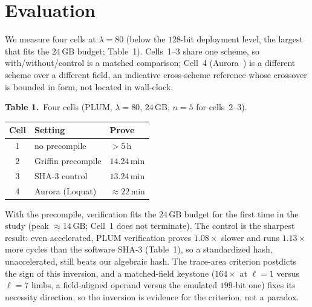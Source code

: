 \section{Evaluation}
We measure four cells at $\lambda=80$ (below the $128$-bit deployment level, the largest that fits the $24\,\mathrm{GB}$ budget; Table~1). Cells~1--3 share one scheme, so with/without/control is a matched comparison; Cell~4 (Aurora~\cite{cryptoeprint:2018/828}) is a different scheme over a different field, an indicative cross-scheme reference whose crossover is bounded in form, not located in wall-clock.

{\par\medskip\centering\footnotesize
\textbf{Table 1.}~Four cells (PLUM, $\lambda{=}80$, $24$\,GB, $n{=}5$ for cells~2--3).\\[3pt]
\begin{tabular}{cll}
\hline
Cell & Setting & Prove \\
\hline
1 & no precompile      & $>5$\,h \\
2 & Griffin precompile & $14.24$\,min \\
3 & SHA-3 control      & $13.24$\,min \\
4 & Aurora (Loquat)    & ${\approx}22$\,min \\
\hline
\end{tabular}\par\medskip}

With the precompile, verification fits the $24\,\mathrm{GB}$ budget for the first time in the study (peak ${\approx}14\,\mathrm{GB}$; Cell~1 does not terminate). The control is the sharpest result: even accelerated, PLUM verification proves $1.08\times$ slower and runs $1.13\times$ more cycles than the software SHA-3 (Table~1), so a standardized hash, unaccelerated, still beats our algebraic hash. The trace-area criterion postdicts the sign of this inversion, and a matched-field keystone ($164\times$ at $\ell=1$ versus $\ell=7$ limbs, a field-aligned operand versus the emulated $199$-bit one) fixes its necessity direction, so the inversion is evidence for the criterion, not a paradox.
